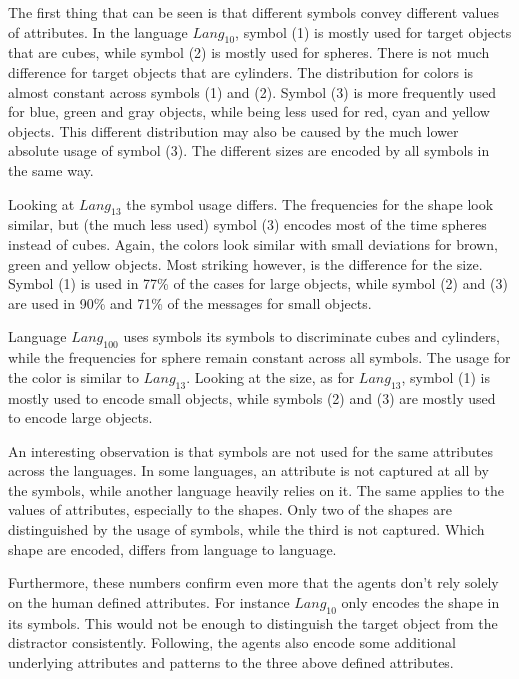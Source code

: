 The first thing that can be seen is that different symbols convey different values of attributes.
In the language $Lang_{10}$, symbol (1) is mostly used for target objects that are cubes, while symbol (2) is mostly used for spheres.
There is not much difference for target objects that are cylinders.
The distribution for colors is almost constant across symbols (1) and (2).
Symbol (3) is more frequently used for blue, green and gray objects, while being less used for red, cyan and yellow objects.
This different distribution may also be caused by the much lower absolute usage of symbol (3).
The different sizes are encoded by all symbols in the same way.

Looking at $Lang_{13}$ the symbol usage differs.
The frequencies for the shape look similar, but (the much less used) symbol (3) encodes most of the time spheres instead of cubes.
Again, the colors look similar with small deviations for brown, green and yellow objects.
Most striking however, is the difference for the size.
Symbol (1) is used in 77\% of the cases for large objects, while symbol (2) and (3) are used in 90\% and 71\% of the messages for small objects.

Language $Lang_{100}$ uses symbols its symbols to discriminate cubes and cylinders, while the frequencies for sphere remain constant across all symbols.
The usage for the color is similar to $Lang_{13}$.
Looking at the size, as for $Lang_{13}$, symbol (1) is mostly used to encode small objects, while symbols (2) and (3) are mostly used to encode large objects.

An interesting observation is that symbols are not used for the same attributes across the languages.
In some languages, an attribute is not captured at all by the symbols, while another language heavily relies on it.
The same applies to the values of attributes, especially to the shapes.
Only two of the shapes are distinguished by the usage of symbols, while the third is not captured.
Which shape are encoded, differs from language to language.

Furthermore, these numbers confirm even more that the agents don't rely solely on the human defined attributes.
For instance $Lang_{10}$ only encodes the shape in its symbols.
This would not be enough to distinguish the target object from the distractor consistently.
Following, the agents also encode some additional underlying attributes and patterns to the three above defined attributes.



